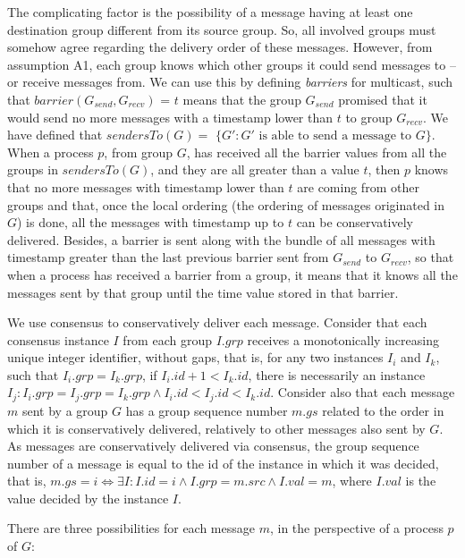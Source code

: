 \documentclass[times, 10pt]{article}
\begin{document}
The complicating factor is the possibility of a message having at least one destination group different from its source group. So, all involved groups must somehow agree regarding the delivery order of these messages. However, from assumption A1, each group knows which other groups it could send messages to -- or receive messages from. We can use this by defining \emph{barriers} for multicast, such that $barrier(G_{send},G_{recv})$ = $t$ means that the group $G_{send}$ promised that it would send no more messages with a timestamp lower than $t$ to group $G_{recv}$. We have defined that $sendersTo(G) =$ \mbox{$\{G' : G'\text{ is able to send a message to }G\}$}. When a process $p$, from group $G$, has received all the barrier values from all the groups in $sendersTo(G)$, and they are all greater than a value $t$, then $p$ knows that no more messages with timestamp lower than $t$ are coming from other groups and that, once the local ordering (the ordering of messages originated in $G$) is done, all the messages with timestamp up to $t$ can be conservatively delivered. Besides, a barrier is sent along with the bundle of all messages with timestamp greater than the last previous barrier sent from $G_{send}$ to $G_{recv}$, so that when a process has received a barrier from a group, it means that it knows all the messages sent by that group until the time value stored in that barrier. 

We use consensus to conservatively deliver each message. Consider that each consensus instance $I$ from each group $I.grp$ receives a monotonically increasing unique integer identifier, without gaps, that is, for any two instances $I_i$ and $I_k$, such that $I_i.grp = I_k.grp$, if $I_i.id + 1 < I_k.id$, there is necessarily an instance $I_j : I_i.grp = I_j.grp = I_k.grp \wedge I_i.id < I_j.id < I_k.id$. Consider also that each message $m$ sent by a group $G$ has a group sequence number $m.gs$ related to the order in which it is conservatively delivered, relatively to other messages also sent by $G$. As messages are conservatively delivered via consensus, the group sequence number of a message is equal to the id of the instance in which it was decided, that is, $m.gs = i \Leftrightarrow \exists I : I.id = i \wedge I.grp = m.src \wedge I.val = m$, where $I.val$ is the value decided by the instance $I$.

There are three possibilities for each message $m$, in the perspective of a process $p$ of $G$:
\end{document}
